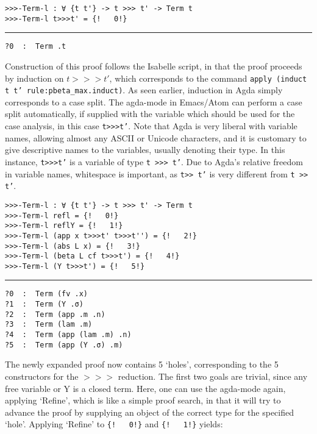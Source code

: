 \documentclass[a4paper, 12pt, twoside]{style/ociamthesis}
\theoremstyle{plain}
\theoremstyle{definition}
\theoremstyle{remark}
\begin{document}
\begin{verbatim}
>>>-Term-l : ∀ {t t'} -> t >>> t' -> Term t
>>>-Term-l t>>>t' = {!   0!}
\end{verbatim}

\noindent\rule{8cm}{0.4pt}

\begin{verbatim}
?0  :  Term .t
\end{verbatim}

Construction of this proof follows the Isabelle script, in that the
proof proceeds by induction on \(t >>> t'\), which corresponds to the
command \texttt{apply (induct t t' rule:pbeta\_max.induct)}. As seen
earlier, induction in Agda simply corresponds to a case split. The
agda-mode in Emacs/Atom can perform a case split automatically, if
supplied with the variable which should be used for the case analysis,
in this case \texttt{t>>>t'}. Note that Agda is very liberal with
variable names, allowing almost any ASCII or Unicode characters, and it
is customary to give descriptive names to the variables, usually
denoting their type. In this instance, \texttt{t>>>t'} is a variable of
type \texttt{t >>> t'}. Due to Agda's relative freedom in variable
names, whitespace is important, as \texttt{t>> t'} is very different
from \texttt{t >> t'}.

\begin{verbatim}
>>>-Term-l : ∀ {t t'} -> t >>> t' -> Term t
>>>-Term-l refl = {!   0!}
>>>-Term-l reflY = {!   1!}
>>>-Term-l (app x t>>>t' t>>>t'') = {!   2!}
>>>-Term-l (abs L x) = {!   3!}
>>>-Term-l (beta L cf t>>>t') = {!   4!}
>>>-Term-l (Y t>>>t') = {!   5!}
\end{verbatim}

\noindent\rule{8cm}{0.4pt}

\begin{verbatim}
?0  :  Term (fv .x)
?1  :  Term (Y .σ)
?2  :  Term (app .m .n)
?3  :  Term (lam .m)
?4  :  Term (app (lam .m) .n)
?5  :  Term (app (Y .σ) .m)
\end{verbatim}

The newly expanded proof now contains 5 `holes', corresponding to the 5
constructors for the \(>>>\) reduction. The first two goals are trivial,
since any free variable or Y is a closed term. Here, one can use the
agda-mode again, applying `Refine', which is like a simple proof search,
in that it will try to advance the proof by supplying an object of the
correct type for the specified `hole'. Applying `Refine' to
\texttt{\{!\ \ \ 0!\}} and \texttt{\{!\ \ \ 1!\}} yields:
\end{document}
